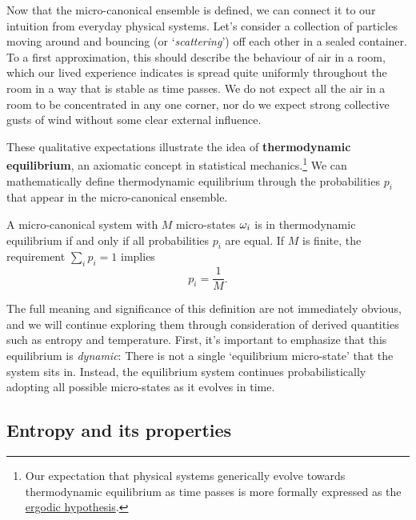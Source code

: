 Now that the micro-canonical ensemble is defined, we can connect it to our intuition from everyday physical systems.
Let's consider a collection of particles moving around and bouncing (or `\textit{scattering}') off each other in a sealed container.
To a first approximation, this should describe the behaviour of air in a room, which our lived experience indicates is spread quite uniformly throughout the room in a way that is stable as time passes.
We do not expect all the air in a room to be concentrated in any one corner, nor do we expect strong collective gusts of wind without some clear external influence.

These qualitative expectations illustrate the idea of \textbf{thermodynamic equilibrium}, an axiomatic concept in statistical mechanics.\footnote{Our expectation that physical systems generically evolve towards thermodynamic equilibrium as time passes is more formally expressed as the \href{https://en.wikipedia.org/wiki/Ergodic_hypothesis}{ergodic hypothesis}.}
We can mathematically define thermodynamic equilibrium through the probabilities $p_i$ that appear in the micro-canonical ensemble.

\begin{shaded}
  A micro-canonical system \Om with $M$ micro-states $\omega_i$ is in thermodynamic equilibrium if and only if all probabilities $p_i$ are equal.
  If $M$ is finite, the requirement $\sum_i p_i = 1$ implies
  \begin{equation}
    \label{eq:micro_equil}
    p_i = \frac{1}{M}.
  \end{equation}
\end{shaded}

The full meaning and significance of this definition are not immediately obvious, and we will continue exploring them through consideration of derived quantities such as entropy and temperature.
First, it's important to emphasize that this equilibrium is \textit{dynamic}: There is not a single `equilibrium micro-state' that the system sits in.
Instead, the equilibrium system continues probabilistically adopting all possible micro-states as it evolves in time. %



\subsection{\label{sec:entropy}Entropy and its properties}
